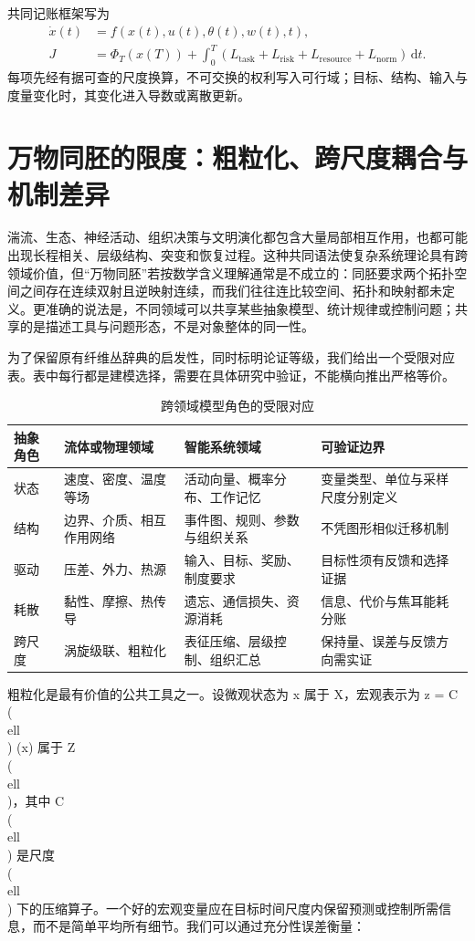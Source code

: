共同记账框架写为
\begin{align}
\dot x(t)&=f(x(t),u(t),\theta(t),w(t),t),\\
J&=\Phi_T(x(T))+\int_0^T(L_{\mathrm{task}}+L_{\mathrm{risk}}+L_{\mathrm{resource}}+L_{\mathrm{norm}})\,\mathrm dt.
\end{align}
每项先经有据可查的尺度换算，不可交换的权利写入可行域；目标、结构、输入与度量变化时，其变化进入导数或离散更新。

\section{万物同胚的限度：粗粒化、跨尺度耦合与机制差异}

\label{sec:homeomorphism_of_everything}

湍流、生态、神经活动、组织决策与文明演化都包含大量局部相互作用，也都可能出现长程相关、层级结构、突变和恢复过程。这种共同语法使复杂系统理论具有跨领域价值，但“万物同胚”若按数学含义理解通常是不成立的：同胚要求两个拓扑空间之间存在连续双射且逆映射连续，而我们往往连比较空间、拓扑和映射都未定义。更准确的说法是，不同领域可以共享某些抽象模型、统计规律或控制问题；共享的是描述工具与问题形态，不是对象整体的同一性。

为了保留原有纤维丛辞典的启发性，同时标明论证等级，我们给出一个受限对应表。表中每行都是建模选择，需要在具体研究中验证，不能横向推出严格等价。

\begin{table}[htbp]
\centering\small
\begin{tabularx}{\textwidth}{@{}lXXX@{}}
\toprule
抽象角色 & 流体或物理领域 & 智能系统领域 & 可验证边界 \\
\midrule
状态 & 速度、密度、温度等场 & 活动向量、概率分布、工作记忆 & 变量类型、单位与采样尺度分别定义 \\
结构 & 边界、介质、相互作用网络 & 事件图、规则、参数与组织关系 & 不凭图形相似迁移机制 \\
驱动 & 压差、外力、热源 & 输入、目标、奖励、制度要求 & 目标性须有反馈和选择证据 \\
耗散 & 黏性、摩擦、热传导 & 遗忘、通信损失、资源消耗 & 信息、代价与焦耳能耗分账 \\
跨尺度 & 涡旋级联、粗粒化 & 表征压缩、层级控制、组织汇总 & 保持量、误差与反馈方向需实证 \\
\bottomrule
\end{tabularx}
\caption{跨领域模型角色的受限对应}
\label{tab:fiber_bundle_dictionary}
\end{table}

粗粒化是最有价值的公共工具之一。设微观状态为 x 属于 X，宏观表示为 z = C\\(\\ell\\) (x) 属于 Z\\(\\ell\\)，其中 C\\(\\ell\\) 是尺度\\(\\ell\\) 下的压缩算子。一个好的宏观变量应在目标时间尺度内保留预测或控制所需信息，而不是简单平均所有细节。我们可以通过充分性误差衡量：


